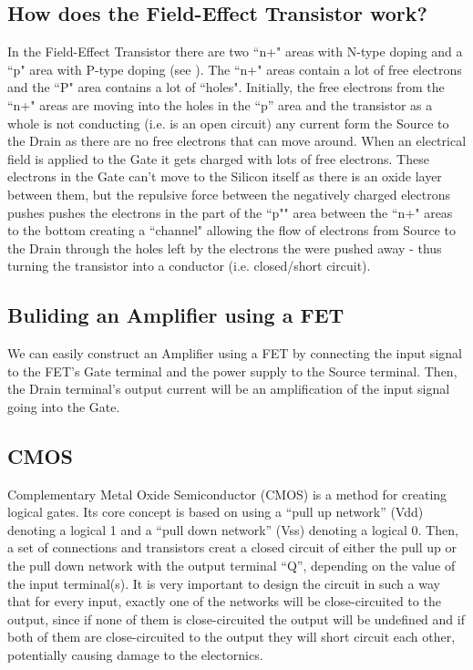 \subsection{How does the Field-Effect Transistor work? }

In the Field-Effect Transistor there are two ``n+" areas with N-type doping and a ``p" area with P-type doping (see ). The
``n+" areas contain a lot of free electrons and the ``P" area contains a lot of
``holes". Initially, the free electrons from the ``n+" areas are moving into the holes in the ``p'' area and the transistor as a whole is not conducting (i.e. is an open circuit) any current form the Source to the Drain as there are no free electrons that can move around. When an electrical field is applied to the Gate it gets charged with lots of free electrons. These electrons in the Gate can't move to the Silicon itself as there is an oxide layer between them, but the repulsive force between the negatively charged electrons pushes pushes the electrons in the part of the ``p"" area between the ``n+" areas to the bottom creating a ``channel" allowing the flow of electrons from Source to the Drain through the holes left by the electrons the were pushed away - thus turning the transistor into a conductor (i.e. closed/short circuit).

\subsection{Buliding an Amplifier using a FET}
We can easily construct an Amplifier using a FET by connecting the input signal to the FET's Gate terminal and the power supply to the Source terminal. Then, the Drain terminal's output current will be an amplification of the input signal going into the Gate.

\subsection{CMOS}
Complementary Metal Oxide Semiconductor (CMOS) is a method for creating logical gates. Its core concept is based on using a ``pull up network'' (Vdd) denoting a logical 1 and a ``pull down network'' (Vss) denoting a logical 0. Then, a set of connections and transistors creat a closed circuit of either the pull up or the pull down network with the output terminal ``Q'', depending on the value of the input terminal(s). It is very important to design the circuit in such a way that for every input, exactly one of the networks will be close-circuited to the output, since if none of them is close-circuited the output will be undefined and if both of them are close-circuited to the output they will short circuit each other, potentially causing damage to the electornics.

